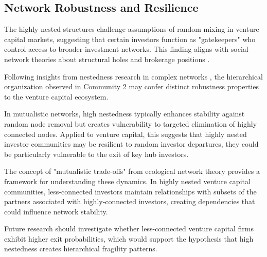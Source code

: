\subsection{Network Robustness and Resilience}

The highly nested structures challenge assumptions of random mixing in venture capital markets, suggesting that certain investors function as "gatekeepers" who control access to broader investment networks. This finding aligns with social network theories about structural holes and brokerage positions \cite{Borgatti2011}.

Following insights from nestedness research in complex networks \cite{Mariani2019}, the hierarchical organization observed in Community 2 may confer distinct robustness properties to the venture capital ecosystem. 

In mutualistic networks, high nestedness typically enhances stability against random node removal but creates vulnerability to targeted elimination of highly connected nodes. Applied to venture capital, this suggests that highly nested investor communities may be resilient to random investor departures, they could be particularly vulnerable to the exit of key hub investors.

The concept of "mutualistic trade-offs" from ecological network theory provides a framework for understanding these dynamics. In highly nested venture capital communities, less-connected investors maintain relationships with subsets of the partners associated with highly-connected investors, creating dependencies that could influence network stability. 

Future research should investigate whether less-connected venture capital firms exhibit higher exit probabilities, which would support the hypothesis that high nestedness creates hierarchical fragility patterns.
